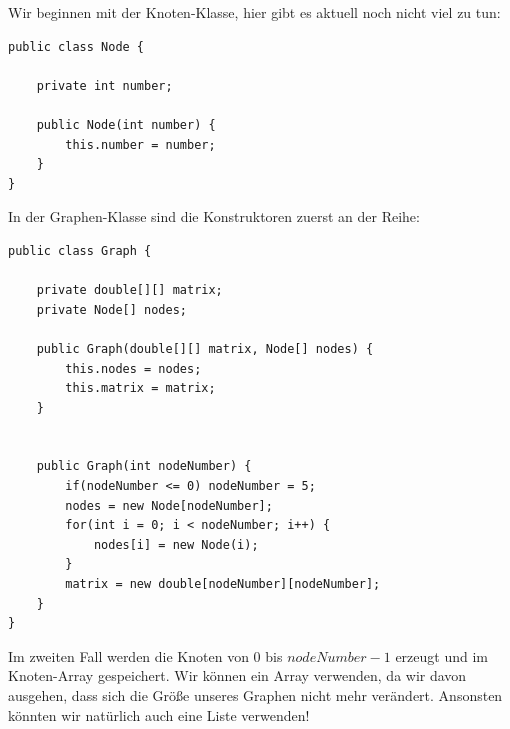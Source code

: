 \documentclass{article}
\begin{document}
Wir beginnen mit der Knoten-Klasse, hier gibt es aktuell noch nicht viel zu tun:
\begin{verbatim}
public class Node {

    private int number;

    public Node(int number) {
        this.number = number;
    }
}
\end{verbatim}
In der Graphen-Klasse sind die Konstruktoren zuerst an der Reihe: 
\begin{verbatim}
public class Graph {

    private double[][] matrix;
    private Node[] nodes;

    public Graph(double[][] matrix, Node[] nodes) {
        this.nodes = nodes;
        this.matrix = matrix;
    }


    public Graph(int nodeNumber) {
        if(nodeNumber <= 0) nodeNumber = 5;
        nodes = new Node[nodeNumber];
        for(int i = 0; i < nodeNumber; i++) {
            nodes[i] = new Node(i);
        }
        matrix = new double[nodeNumber][nodeNumber];
    }
}
\end{verbatim}
Im zweiten Fall werden die Knoten von $0$ bis $nodeNumber - 1$ erzeugt und im Knoten-Array gespeichert. Wir können ein Array verwenden, da wir davon ausgehen, dass sich die Größe unseres Graphen nicht mehr verändert. Ansonsten könnten wir natürlich auch eine Liste verwenden! \vspace{2mm} \\
\end{document}
